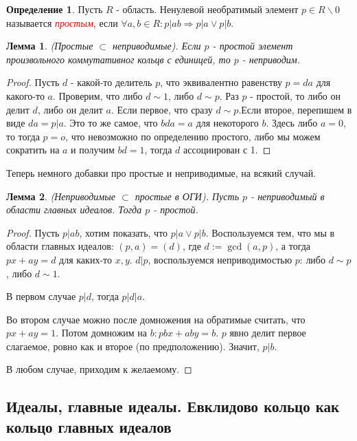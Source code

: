 \documentclass[a4paper,100pt]{article}
\theoremstyle{indented}
\newtheorem{lemma}{Лемма}
\theoremstyle{definition}
\newtheorem{defn}{Определение}
\theoremstyle{remark}
\begin{document}
\begin{defn}
    Пусть $R$ - область. Ненулевой необратимый элемент $p\in R\backslash 0$ называется \hypertarget{n8}{\textcolor{red}{\textit{простым}}}, если $\forall a,b\in R: p\vert ab \Longrightarrow p\vert a \vee p\vert b$.
\end{defn}

\begin{lemma}
    (Простые $\subset$ неприводимые). Если $p$ - простой элемент произвольного коммутативног кольцв с единицей, то $p$ - неприводим.
\end{lemma}

\begin{proof}
    Пусть $d$ - какой-то делитель $p$, что эквивалентно равенству $p=da$ для какого-то $a$. Проверим, что либо $d\sim 1$, либо $d\sim p$. Раз $p$ - простой, то либо он делит $d$, либо он делит $a$. Если первое, что сразу $d\sim p$.Если второе, перепишем в виде $da=p\vert a$. Это то же самое, что $bda=a$ для некоторого $b$. Здесь либо $a=0$, то тогда $p=o$, что невозможно по определению простого, либо мы можем сократить на $a$ и получим $bd=1$, тогда $d$ ассоциирован с 1.
\end{proof}

Теперь немного добавки про простые и неприводимые, на всякий случай.\\

\begin{lemma}
    (Неприводимые $\subset$ простые в ОГИ). Пусть $p$ - неприводимый в области главных идеалов. Тогда $p$ - простой.
\end{lemma}

\begin{proof}
    Пусть $p\vert ab$, хотим показать, что $p\vert a \vee p\vert b$. Воспользуемся тем, что мы в области главных идеалов: $(p,a)=(d)$, где $d:=\gcd (a, p)$, а тогда $px+ay=d$ для каких-то $x, y$. $d\vert p$, воспользуемся неприводимостью $p$: либо $d\sim p$, либо $d\sim 1$.\
    
    В первом случае $p\vert d$, тогда $p\vert d\vert a$.\

    Во втором случае можно после домножения на обратимые считать, что $px+ay=1$. Потом домножим на $b:pbx+aby=b$. $p$ явно делит первое слагаемое, ровно как и второе (по предположению). Значит, $p\vert b$.\

    В любом случае, приходим к желаемому.
\end{proof}

\resetall

\subsection{Идеалы, главные идеалы. Евклидово кольцо как кольцо главных идеалов}
\end{document}
